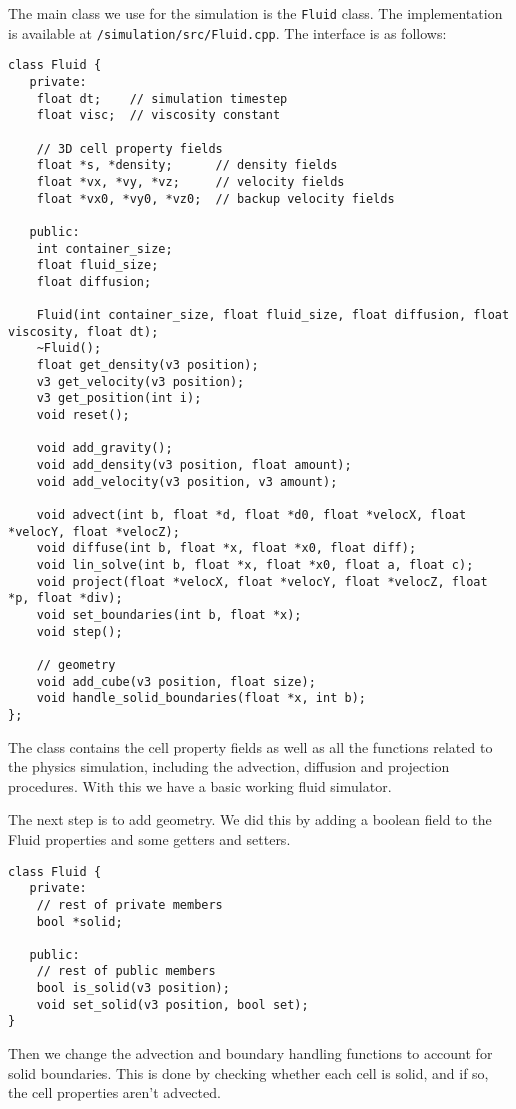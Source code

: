 \documentclass[a4paper,12pt]{article}
\begin{document}
The main class we use for the simulation is the \verb|Fluid| class. The implementation
is available at \verb|/simulation/src/Fluid.cpp|. The interface is as follows:
\begin{lstlisting}
class Fluid {
   private:
	float dt;    // simulation timestep
	float visc;  // viscosity constant

	// 3D cell property fields
	float *s, *density;      // density fields
	float *vx, *vy, *vz;     // velocity fields
	float *vx0, *vy0, *vz0;  // backup velocity fields

   public:
	int container_size;
	float fluid_size;
	float diffusion;

	Fluid(int container_size, float fluid_size, float diffusion, float viscosity, float dt);
	~Fluid();
	float get_density(v3 position);
	v3 get_velocity(v3 position);
	v3 get_position(int i);
	void reset();

	void add_gravity();
	void add_density(v3 position, float amount);
	void add_velocity(v3 position, v3 amount);

	void advect(int b, float *d, float *d0, float *velocX, float *velocY, float *velocZ);
	void diffuse(int b, float *x, float *x0, float diff);
	void lin_solve(int b, float *x, float *x0, float a, float c);
	void project(float *velocX, float *velocY, float *velocZ, float *p, float *div);
	void set_boundaries(int b, float *x);
	void step();

	// geometry
	void add_cube(v3 position, float size);
	void handle_solid_boundaries(float *x, int b);
};
\end{lstlisting}

The class contains the cell property fields as well as all the functions related
to the physics simulation, including the advection, diffusion and projection procedures.
With this we have a basic working fluid simulator.

The next step is to add geometry. We did this by adding a boolean field to the
Fluid properties and some getters and setters.
\begin{lstlisting}
class Fluid {
   private:
	// rest of private members
	bool *solid;

   public:
	// rest of public members
	bool is_solid(v3 position);
	void set_solid(v3 position, bool set);
}
\end{lstlisting}
Then we change the advection and boundary handling functions to account for
solid boundaries. This is done by checking whether each cell is solid, and if
so, the cell properties aren't advected.
\end{document}
